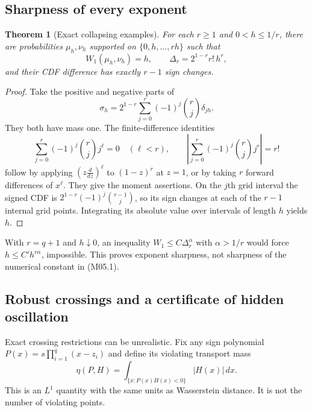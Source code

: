 \documentclass[11pt,a4paper]{article}
\newtheorem{theorem}{Theorem}[section]
\theoremstyle{definition}\newtheorem{definition}[theorem]{Definition}
\theoremstyle{remark}\newtheorem{remark}[theorem]{Remark}
\numberwithin{equation}{section}
\begin{document}
\subsection{Sharpness of every exponent}\label{M05-sec-3}
\begin{theorem}[Exact collapsing examples]\label{M05-th:sharp}
For each $r\ge1$ and $0<h\le1/r$, there are probabilities $\mu_h,\nu_h$ supported on $\{0,h,\ldots,rh\}$ such that
\[
 W_1(\mu_h,\nu_h)=h,\qquad
 \Delta_r=2^{1-r}r!\,h^r,
\]
and their CDF difference has exactly $r-1$ sign changes.
\end{theorem}
\begin{proof}
Take the positive and negative parts of
\[
 \sigma_h=2^{1-r}\sum_{j=0}^r(-1)^j\binom{r}{j}\delta_{jh}.
\]
They both have mass one. The finite-difference identities
\[
 \sum_{j=0}^r(-1)^j\binom{r}{j}j^\ell=0\quad(\ell<r),
 \qquad
 \left|\sum_{j=0}^r(-1)^j\binom{r}{j}j^r\right|=r!
\]
follow by applying $(z\frac{d}{dz})^\ell$ to $(1-z)^r$ at $z=1$, or by taking $r$ forward differences of $x^\ell$. They give the moment assertions. On the $j$th grid interval the signed CDF is
$2^{1-r}(-1)^j\binom{r-1}{j}$, so its sign changes at each of the $r-1$ internal grid points. Integrating its absolute value over intervals of length $h$ yields $h$.
\end{proof}
With $r=q+1$ and $h\downarrow0$, an inequality $W_1\le C\Delta_r^\alpha$ with $\alpha>1/r$ would force $h\le C' h^{r\alpha}$, impossible. This proves exponent sharpness, not sharpness of the numerical constant in (M05.1).

\subsection{Robust crossings and a certificate of hidden oscillation}\label{M05-sec-4}
Exact crossing restrictions can be unrealistic. Fix any sign polynomial $P(x)=s\prod_{i=1}^q(x-z_i)$ and define its violating transport mass
\[
 \eta(P,H)=\int_{\{x:P(x)H(x)<0\}}|H(x)|\,dx.
\]
This is an $L^1$ quantity with the same units as Wasserstein distance. It is not the number of violating points.
\end{document}

